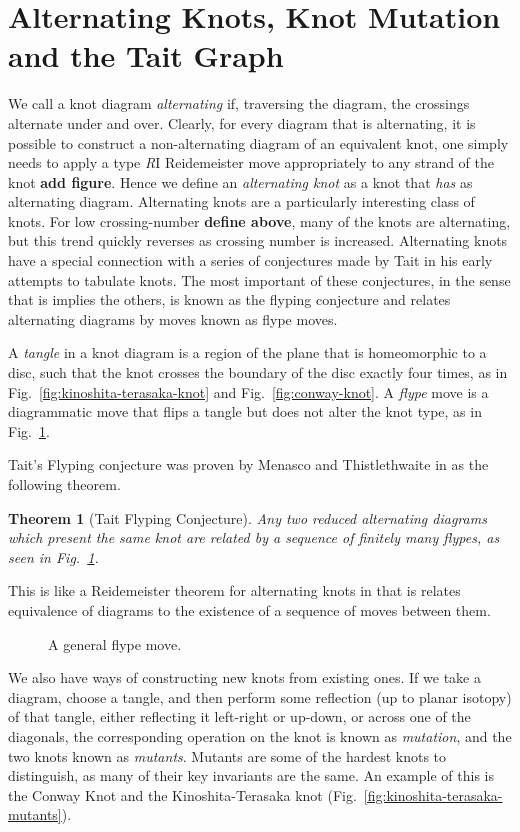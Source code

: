 \documentclass[12pt]{report}
\newcommand{\notered}[1]{{\color{Red} \textbf{#1}}}
\newtheorem*{theorem}{Theorem}
\begin{document}
\section{Alternating Knots, Knot Mutation and the Tait Graph}
We call a knot diagram \textit{alternating} if, traversing the diagram, the crossings alternate under and over. Clearly, for every diagram that is alternating, it is possible to construct a non-alternating diagram of an equivalent knot, one simply needs to apply a type \textit{R}I Reidemeister move appropriately to any strand of the knot \notered{add figure}. Hence we define an \textit{alternating knot} as a knot that \textit{has} as alternating diagram. Alternating knots are a particularly interesting class of knots. For low crossing-number \notered{define above}, many of the knots are alternating, but this trend quickly reverses as crossing number is increased. Alternating knots have a special connection with a series of conjectures made by Tait in his early attempts to tabulate knots. The most important of these conjectures, in the sense that is implies the others, is known as the flyping conjecture and relates alternating diagrams by moves known as flype moves.

A \textit{tangle} in a knot diagram is a region of the plane that is homeomorphic to a disc, such that the knot crosses the boundary of the disc exactly four times, as in Fig.~\ref{fig:kinoshita-terasaka-knot} and Fig.~\ref{fig:conway-knot}. A \textit{flype} move is a diagrammatic move that flips a tangle but does not alter the knot type, as in Fig.~\ref{fig:flype}.

Tait's Flyping conjecture was proven by Menasco and Thistlethwaite in \cite{classification-alternating-links} as the following theorem.
\begin{theorem}[Tait Flyping Conjecture]
	Any two reduced alternating diagrams which present the same knot are related by a sequence of finitely many flypes, as seen in Fig.~\ref{fig:flype}.
\end{theorem}
This is like a Reidemeister theorem for alternating knots in that is relates equivalence of diagrams to the existence of a sequence of moves between them.

\begin{figure}[hbt]
	\centering
	\def\svgscale{0.5}
	
	\caption{A general flype move.}
	\label{fig:flype}
\end{figure}

We also have ways of constructing new knots from existing ones. If we take a diagram, choose a tangle, and then perform some reflection (up to planar isotopy) of that tangle, either reflecting it left-right or up-down, or across one of the diagonals, the corresponding operation on the knot is known as \textit{mutation}, and the two knots known as \textit{mutants}. Mutants are some of the hardest knots to distinguish, as many of their key invariants are the same. An example of this is the Conway Knot and the Kinoshita-Terasaka knot (Fig.~\ref{fig:kinoshita-terasaka-mutants}).
\end{document}
